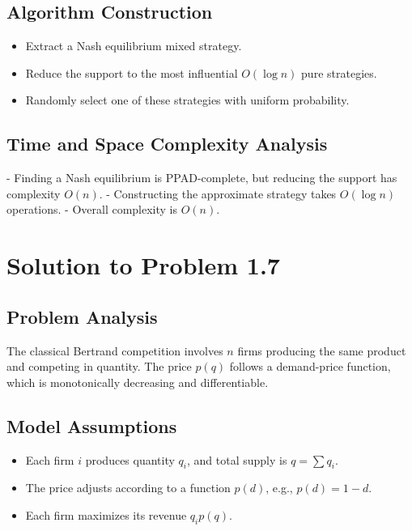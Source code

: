 \documentclass{article}
\begin{document}
\subsection*{Algorithm Construction}
\begin{itemize}
    \item Extract a Nash equilibrium mixed strategy.
    \item Reduce the support to the most influential $O(\log n)$ pure strategies.
    \item Randomly select one of these strategies with uniform probability.
\end{itemize}

\subsection*{Time and Space Complexity Analysis}
- Finding a Nash equilibrium is PPAD-complete, but reducing the support has complexity $O(n)$.
- Constructing the approximate strategy takes $O(\log n)$ operations.
- Overall complexity is $O(n)$.

\section*{Solution to Problem 1.7}

\subsection*{Problem Analysis}
The classical Bertrand competition involves $n$ firms producing the same product and competing in quantity. The price $p(q)$ follows a demand-price function, which is monotonically decreasing and differentiable.

\subsection*{Model Assumptions}
\begin{itemize}
    \item Each firm $i$ produces quantity $q_i$, and total supply is $q = \sum q_i$.
    \item The price adjusts according to a function $p(d)$, e.g., $p(d) = 1 - d$.
    \item Each firm maximizes its revenue $q_i p(q)$.
\end{itemize}
\end{document}
